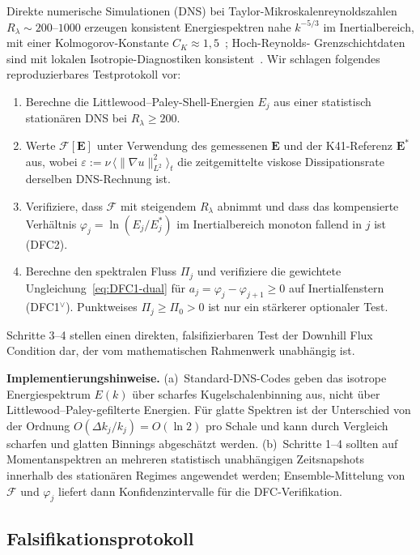 \documentclass[12pt,a4paper]{article}
\theoremstyle{breakdef}
\theoremstyle{breakplain}
\theoremstyle{breakdef}
\begin{document}
Direkte numerische Simulationen (DNS) bei Taylor-Mikroskalenreynoldszahlen
$R_\lambda \sim 200$--$1000$ erzeugen konsistent Energiespektren nahe
$k^{-5/3}$ im Inertialbereich, mit einer Kolmogorov-Konstante
$C_K \approx 1{,}5$~\cite{ES06,Frisch95,MY75}; Hoch-Reynolds-
Grenzschichtdaten sind mit lokalen Isotropie-Diagnostiken
konsistent~\cite{SaddoughiVeeravalli94}. Wir schlagen folgendes
reproduzierbares Testprotokoll vor:
\begin{enumerate}
\item Berechne die Littlewood--Paley-Shell-Energien $E_j$ aus einer
  statistisch stationären DNS bei $R_\lambda \ge 200$.
\item Werte $\mathcal{F}[\mathbf{E}]$ unter Verwendung des gemessenen
  $\mathbf{E}$ und der K41-Referenz $\mathbf{E}^*$ aus, wobei
  $\varepsilon := \nu\,\langle\|\nabla u\|_{L^2}^2\rangle_t$
  die zeitgemittelte viskose Dissipationsrate derselben DNS-Rechnung ist.
\item Verifiziere, dass $\mathcal{F}$ mit steigendem $R_\lambda$
  abnimmt und dass das kompensierte Verhältnis
  $\varphi_j = \ln(E_j/E_j^*)$ im Inertialbereich monoton fallend
  in $j$ ist (DFC2).
\item Berechne den spektralen Fluss $\Pi_j$ und verifiziere die gewichtete
  Ungleichung~\eqref{eq:DFC1-dual} für
  $a_j=\varphi_j-\varphi_{j+1}\ge0$ auf Inertialfenstern
  (DFC1$^\vee$). Punktweises $\Pi_j\ge\Pi_0>0$ ist nur ein stärkerer
  optionaler Test.
\end{enumerate}
Schritte 3--4 stellen einen direkten, falsifizierbaren Test der Downhill
Flux Condition dar, der vom mathematischen Rahmenwerk unabhängig ist.

\smallskip\noindent
\textbf{Implementierungshinweise.}\quad
(a)~Standard-DNS-Codes geben das isotrope Energiespektrum $E(k)$ über
scharfes Kugelschalenbinning aus, nicht über Littlewood--Paley-gefilterte
Energien. Für glatte Spektren ist der Unterschied von der Ordnung
$O(\Delta k_j / k_j) = O(\ln 2)$ pro Schale und kann durch Vergleich
scharfen und glatten Binnings abgeschätzt werden.
(b)~Schritte 1--4 sollten auf Momentanspektren an mehreren statistisch
unabhängigen Zeitsnapshots innerhalb des stationären Regimes angewendet
werden; Ensemble-Mittelung von $\mathcal{F}$ und $\varphi_j$ liefert
dann Konfidenzintervalle für die DFC-Verifikation.

\subsection{Falsifikationsprotokoll}
\label{sec:falsification}
\end{document}
